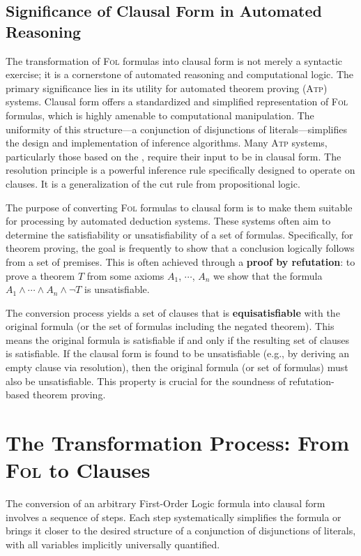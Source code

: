 \subsection{Significance of Clausal Form in Automated Reasoning}
The transformation of \textsc{Fol} formulas into clausal form is not merely a syntactic exercise; it is a
cornerstone of automated reasoning and computational logic. The primary significance lies in its utility for
automated theorem proving (\textsc{Atp}) systems. 
Clausal form offers a standardized and simplified representation of \textsc{Fol} formulas, which is highly
amenable to computational manipulation. The uniformity of this structure---a conjunction of disjunctions of
literals---simplifies the design and implementation of inference algorithms. Many \textsc{Atp} systems, particularly
those based on the , require their input to be in clausal form. The resolution
principle is a powerful inference rule specifically designed to operate on clauses.  It is a generalization of
the cut rule from propositional logic.

The purpose of converting \textsc{Fol} formulas to clausal form is to make them suitable for
processing by automated deduction systems. These systems often aim to determine the satisfiability or
unsatisfiability of a set of formulas. Specifically, for theorem proving, the goal is frequently to show that a
conclusion logically follows from a set of premises. This is often achieved through
a \textbf{proof by refutation}: to prove a theorem $T$ from some axioms $A_1$, $\cdots$, $A_n$
we show that the formula $A_1 \land \cdots \land A_n \land \neg T$ is unsatisfiable.  

The conversion process yields a set of clauses that is \textbf{equisatisfiable} with the original formula (or
the set of formulas including the negated theorem). This means the original formula is satisfiable if and only
if the resulting set of clauses is satisfiable. If the clausal form is found to be unsatisfiable (e.g., by
deriving an empty clause via resolution), then the original formula (or set of formulas) must also be
unsatisfiable. This property is crucial for the soundness of refutation-based theorem proving. 

\section{The Transformation Process: From \textsc{Fol} to Clauses}
The conversion of an arbitrary First-Order Logic formula into clausal form involves a sequence of steps. Each
step systematically simplifies the formula or brings it closer to the desired structure of a conjunction of
disjunctions of literals, with all variables implicitly universally quantified. 

